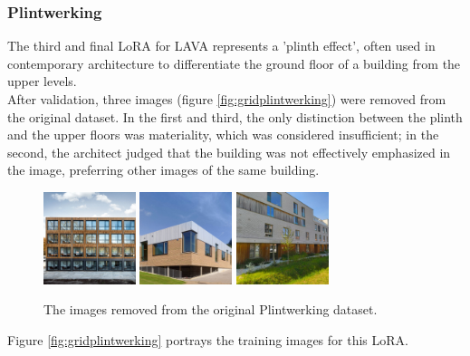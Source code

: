\subsubsection{Plintwerking}
The third and final LoRA for LAVA represents a 'plinth effect', often used in contemporary architecture to differentiate the ground floor of a building from the upper levels.\\
After validation, three images (figure \ref{fig:gridplintwerking}) were removed from the original dataset. In the first and third, the only distinction between the plinth and the upper floors was materiality, which was considered insufficient; in the second, the architect judged that the building was not effectively emphasized in the image, preferring other images of the same building.
\begin{figure}[H]
  \centering
  \includegraphics[width=0.24\textwidth]{Images/LoRAs/Plintwerking/2.jpg}%
  \hspace{0.005\textwidth} 
  \includegraphics[width=0.24\textwidth]{Images/LoRAs/Plintwerking/5.jpeg}
  \hspace{0.005\textwidth}
  \includegraphics[width=0.24\textwidth]{Images/LoRAs/Plintwerking/6.jpg}
  \caption{The images removed from the original Plintwerking dataset.}
  \label{fig:removedplintwerking}
\end{figure}
Figure \ref{fig:gridplintwerking} portrays the training images for this LoRA.
